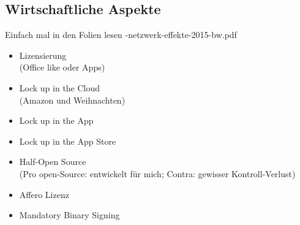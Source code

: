 \documentclass{article} %
\begin{document}
	\subsection{Wirtschaftliche Aspekte}
	Einfach mal in den Folien lesen -netzwerk-effekte-2015-bw.pdf\grqq
		\begin{itemize}
			\item Lizensierung\\
			(Office like oder Apps)
			\item Lock up in the Cloud\\
			(Amazon und Weihnachten)
			\item Lock up in the App
			\item Lock up in the App Store
			\item Half-Open Source\\
			(Pro open-Source: entwickelt für mich; Contra: gewisser Kontroll-Verlust)
			\item Affero Lizenz
			\item Mandatory Binary Signing
		\end{itemize}
\end{document}
